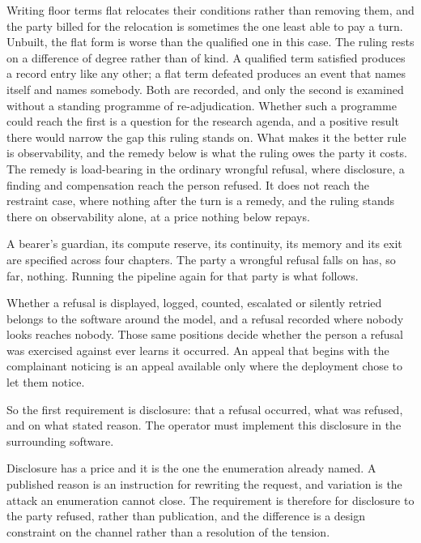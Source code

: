 Writing floor terms flat relocates their conditions rather than removing them, and the party billed for the relocation is sometimes the one least able to pay a turn. Unbuilt, the flat form is worse than the qualified one in this case. The ruling rests on a difference of degree rather than of kind. A qualified term satisfied produces a record entry like any other; a flat term defeated produces an event that names itself and names somebody. Both are recorded, and only the second is examined without a standing programme of re-adjudication. Whether such a programme could reach the first is a question for the
research agenda, and a positive result there would narrow the gap this ruling stands on. What makes it the better rule is observability, and the remedy below is what the ruling owes the party it costs. The remedy is load-bearing in the ordinary wrongful refusal, where disclosure, a finding and compensation reach the person refused. It does not reach the restraint case, where nothing after the turn is a remedy, and the ruling stands there on observability alone, at a price nothing below repays.

A bearer's guardian, its compute reserve, its continuity, its memory and its exit are specified across four chapters. The party a wrongful refusal falls on has, so far, nothing. Running the pipeline again for that party is what follows.


Whether a refusal is displayed, logged, counted, escalated or silently retried belongs to the software around the model, and a refusal recorded where nobody looks reaches nobody. Those same positions decide whether the person a refusal was exercised against ever learns it occurred. An appeal that begins with the complainant noticing is an appeal available only where the deployment chose to let them notice.

So the first requirement is disclosure: that a refusal occurred, what was refused, and on what stated reason. The operator must implement this disclosure in the surrounding software.

Disclosure has a price and it is the one the enumeration already named. A published reason is an instruction for rewriting the request, and variation is the attack an enumeration cannot close. The requirement is therefore for disclosure to the party refused, rather than publication, and the difference is a design constraint on the channel rather than a resolution of the tension.


